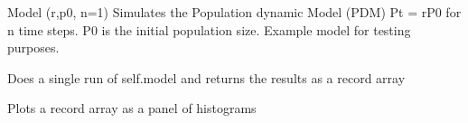 \documentclass[a4paper,10pt,english]{sphinxmanual}
\begin{document}

\begin{fulllineitems}
\label{BIP.Bayes:BIP.Bayes.Melding.model}
Model (r,p0, n=1)
Simulates the Population dynamic Model (PDM) Pt = rP0
for n time steps.
P0 is the initial population size. 
Example model for testing purposes.

\end{fulllineitems}


\begin{fulllineitems}
\label{BIP.Bayes:BIP.Bayes.Melding.model_as_ra}
Does a single run of self.model and returns the results as a record array

\end{fulllineitems}


\begin{fulllineitems}
\label{BIP.Bayes:BIP.Bayes.Melding.plotRaHist}
Plots a record array
as a panel of histograms

\end{fulllineitems}

\end{document}
